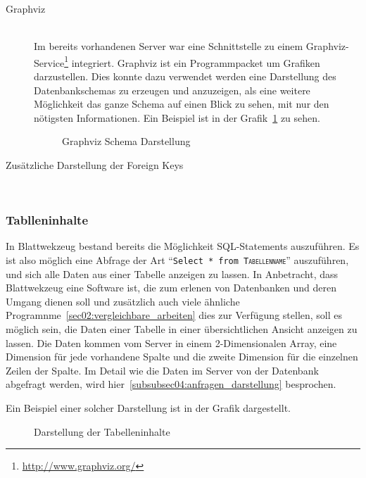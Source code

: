\begin{description}
\item[Graphviz] \hfill\\
Im bereits vorhandenen Server war eine Schnittstelle zu einem Graphviz-Service\footnote{\url{http://www.graphviz.org/}} integriert. Graphviz ist ein Programmpacket um Grafiken darzustellen. Dies konnte dazu verwendet werden eine Darstellung des Datenbankschemas zu erzeugen und anzuzeigen, als eine weitere Möglichkeit das ganze Schema auf einen Blick zu sehen, mit nur den nötigsten Informationen.
Ein Beispiel ist in der Grafik~\ref{pic:graphviz_schema} zu sehen.

\begin{figure}[ht]
    \centering
    \caption{Graphviz Schema Darstellung}
    \label{pic:graphviz_schema}
\end{figure}

\item[Zusätzliche Darstellung der Foreign Keys] \hfill\\


\end{description}

\subsubsection{Tablleninhalte}
\label{subsubsec04:table_content}

In Blattwekzeug bestand bereits die Möglichkeit SQL-Statements auszuführen. Es ist also möglich eine Abfrage der Art ``\texttt{Select * from \textsc{Tabellenname}}'' auszuführen, und sich alle Daten aus einer Tabelle anzeigen zu lassen. In Anbetracht, dass Blattwekzeug eine Software ist, die zum erlenen von Datenbanken und deren Umgang dienen soll und zusätzlich auch viele ähnliche Programnme~\ref{sec02:vergleichbare_arbeiten} dies zur Verfügung stellen, soll es möglich sein, die Daten einer Tabelle in einer übersichtlichen Ansicht anzeigen zu lassen.
Die Daten kommen vom Server in einem 2-Dimensionalen Array, eine Dimension für jede vorhandene Spalte und die zweite Dimension für die einzelnen Zeilen der Spalte.
Im Detail wie die Daten im Server von der Datenbank abgefragt werden, wird hier~\ref{subsubsec04:anfragen_darstellung} 
besprochen.

Ein Beispiel einer solcher Darstellung ist in der Grafik dargestellt.

\begin{figure}[ht]
    \centering
    \caption{Darstellung der Tabelleninhalte}
    \label{pic:table_content}
\end{figure}

